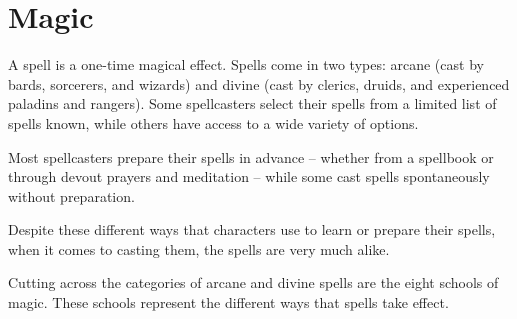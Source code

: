 \chapter{Magic}\label{chapter:Magic}

A spell is a one-time magical effect. Spells come in two types: arcane (cast by 
bards, sorcerers, and wizards) and divine (cast by clerics, druids, and experienced 
paladins and rangers). Some spellcasters select their spells from a limited list 
of spells known, while others have access to a wide variety of options.

Most spellcasters prepare their spells in advance -- whether from a spellbook or 
through devout prayers and meditation --  while some cast spells spontaneously without 
preparation.

Despite these different ways that characters use to learn or prepare their spells, 
when it comes to casting them, the spells are very much alike.

Cutting across the categories of arcane and divine spells are the eight schools 
of magic. These schools represent the different ways that spells take effect.





